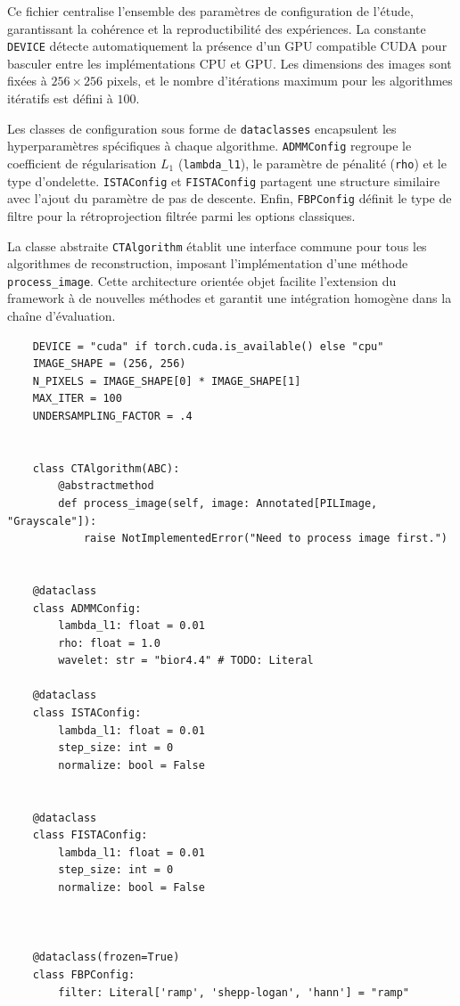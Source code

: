 
Ce fichier centralise l'ensemble des paramètres de configuration de l'étude, garantissant la cohérence et la reproductibilité des expériences. La constante \texttt{DEVICE} détecte automatiquement la présence d'un GPU compatible CUDA pour basculer entre les implémentations CPU et GPU. Les dimensions des images sont fixées à $256 \times 256$ pixels, et le nombre d'itérations maximum pour les algorithmes itératifs est défini à $100$.

Les classes de configuration sous forme de \texttt{dataclasses} encapsulent les hyperparamètres spécifiques à chaque algorithme. \texttt{ADMMConfig} regroupe le coefficient de régularisation $L_1$ (\texttt{lambda\_l1}), le paramètre de pénalité (\texttt{rho}) et le type d'ondelette. \texttt{ISTAConfig} et \texttt{FISTAConfig} partagent une structure similaire avec l'ajout du paramètre de pas de descente. Enfin, \texttt{FBPConfig} définit le type de filtre pour la rétroprojection filtrée parmi les options classiques.

La classe abstraite \texttt{CTAlgorithm} établit une interface commune pour tous les algorithmes de reconstruction, imposant l'implémentation d'une méthode \texttt{process\_image}. Cette architecture orientée objet facilite l'extension du framework à de nouvelles méthodes et garantit une intégration homogène dans la chaîne d'évaluation.

\begin{verbatim}
    DEVICE = "cuda" if torch.cuda.is_available() else "cpu"
    IMAGE_SHAPE = (256, 256)
    N_PIXELS = IMAGE_SHAPE[0] * IMAGE_SHAPE[1]
    MAX_ITER = 100
    UNDERSAMPLING_FACTOR = .4


    class CTAlgorithm(ABC):
        @abstractmethod
        def process_image(self, image: Annotated[PILImage, "Grayscale"]):
            raise NotImplementedError("Need to process image first.")


    @dataclass
    class ADMMConfig:
        lambda_l1: float = 0.01
        rho: float = 1.0
        wavelet: str = "bior4.4" # TODO: Literal

    @dataclass
    class ISTAConfig:
        lambda_l1: float = 0.01
        step_size: int = 0
        normalize: bool = False


    @dataclass
    class FISTAConfig:
        lambda_l1: float = 0.01
        step_size: int = 0
        normalize: bool = False



    @dataclass(frozen=True)
    class FBPConfig:
        filter: Literal['ramp', 'shepp-logan', 'hann'] = "ramp"


\end{verbatim}


